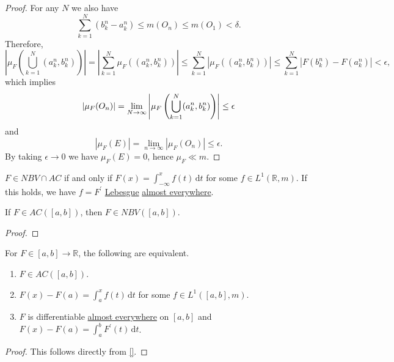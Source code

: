 \begin{proof}
	For any \(N\) we also have
	\[
		\sum_{k=1}^N (b_k^n - a_k^n) \leq m(O_n) \leq m(O_1) < \delta.
	\]
	Therefore,
	\[
		\left\vert \mu_F\left( \bigcup_{k=1}^N (a_k^n,b_k^n) \right) \right\vert
		= \left\vert \sum_{k=1}^N \mu_F((a_k^n,b_k^n)) \right\vert
		\leq \sum_{k=1}^N \left\vert \mu_F((a_k^n,b_k^n)) \right\vert
		\leq \sum_{k=1}^N \left\vert F(b_k^n) - F(a_k^n) \right\vert < \epsilon,
	\]
	which implies
	\[
		\left\vert \mu_F(O_n) \right\vert = \lim_{N \to \infty} \left\vert \mu_F\left( \bigcup_{k=1}^N (a_k^n,b_k^n) \right) \right\vert \leq \epsilon \\
	\]
	and
	\[
		\left\vert \mu_F(E) \right\vert = \lim_{n \to \infty} \left\vert \mu_F(O_n) \right\vert \leq \epsilon.
	\]
	By taking \(\epsilon \to 0\) we have \(\mu_F(E) = 0\), hence \(\mu_F \ll m\).
\end{proof}

\begin{corollary}
	\(F \in NBV \cap AC\) if and only if \(F(x) = \int_{-\infty}^x f(t) \,\mathrm{d}t\) for some \(f \in L^1(\mathbb{R},m)\). If this holds, we have \(f = F^\prime \)
	\hyperref[def:Lebesgue-measure]{Lebesgue} \hyperref[def:mu-almost-everywhere]{almost everywhere}.
\end{corollary}

\begin{lemma}
	If \(F \in AC([a,b])\), then \(F \in NBV([a,b])\).
\end{lemma}

\begin{proof}
\end{proof}

\begin{theorem}\label{thm:FTC}
	For \(F \in [a,b] \to \mathbb{R}\), the following are equivalent.
	\begin{enumerate}[(1)]
		\item \(F \in AC([a,b])\).
		\item \(F(x) - F(a) = \int_a^x f(t) \,\mathrm{d}t\) for some \(f \in L^1([a,b],m)\).
		\item \(F\) is differentiable \hyperref[def:mu-almost-everywhere]{almost everywhere} on \([a,b]\) and \(F(x) - F(a) = \int_a^b F^\prime (t) \,\mathrm{d}t\).
	\end{enumerate}
\end{theorem}
\begin{proof}
	This follows directly from \autoref{}.
\end{proof}


